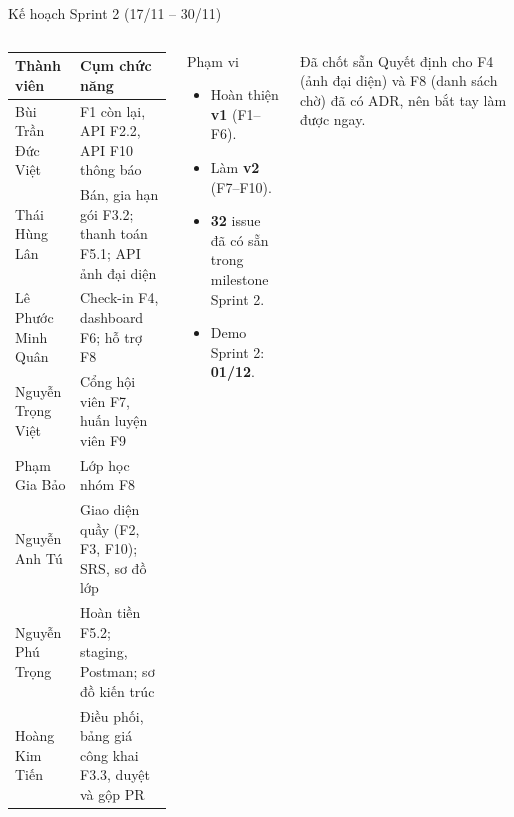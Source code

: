 \documentclass[t, aspectratio=169]{beamer}
\newcommand{\num}[1]{{\color{hustprimary}\bfseries #1}}
\begin{document}
\begin{frame}{Kế hoạch Sprint 2 (17/11 – 30/11)}
\begin{columns}[T,onlytextwidth]
{\scriptsize
\renewcommand{\arraystretch}{1.12}
\begin{tabularx}{\linewidth}{@{}l X@{}}
\toprule
\textbf{Thành viên} & \textbf{Cụm chức năng}\\
\midrule
\rowcolor{soft} Bùi Trần Đức Việt & F1 còn lại, API F2.2, API F10 thông báo\\
Thái Hùng Lân & Bán, gia hạn gói F3.2; thanh toán F5.1; API ảnh đại diện\\
\rowcolor{soft} Lê Phước Minh Quân & Check-in F4, dashboard F6; hỗ trợ F8\\
Nguyễn Trọng Việt & Cổng hội viên F7, huấn luyện viên F9\\
\rowcolor{soft} Phạm Gia Bảo & Lớp học nhóm F8\\
Nguyễn Anh Tú & Giao diện quầy (F2, F3, F10); SRS, sơ đồ lớp\\
\rowcolor{soft} Nguyễn Phú Trọng & Hoàn tiền F5.2; staging, Postman; sơ đồ kiến trúc\\
Hoàng Kim Tiến & Điều phối, bảng giá công khai F3.3, duyệt và gộp PR\\
\bottomrule
\end{tabularx}}
\begin{block}{Phạm vi}
\footnotesize
\begin{itemize}
  \item Hoàn thiện \textbf{v1} (F1–F6).
  \item Làm \textbf{v2} (F7–F10).
  \item \num{32} issue đã có sẵn trong milestone Sprint 2.
  \item Demo Sprint 2: \textbf{01/12}.
\end{itemize}
\end{block}
\vspace{3pt}
\begin{block}{Đã chốt sẵn}
\footnotesize Quyết định cho F4 (ảnh đại diện) và F8 (danh sách chờ) đã có ADR, nên bắt tay làm được ngay.
\end{block}
\end{columns}
\end{frame}

\end{document}
